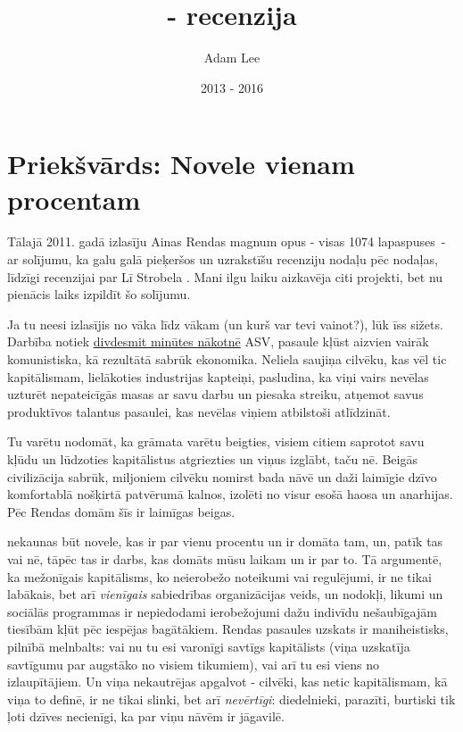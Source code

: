 \documentclass[12pt]{article}
\title{\say{Atlas Shrugged} - recenzija}
\author{Adam Lee}
\date{2013 - 2016}
\begin{document}
\maketitle

\tableofcontents

\section{Priekšvārds: Novele vienam procentam}
\label{sec:foreword}

Tālajā 2011. gadā izlasīju Ainas Rendas magnum opus  - visas 1074 lapaspuses~- ar solījumu, ka galu galā pieķeršos un uzrakstīšu recenziju nodaļu pēc nodaļas, līdzīgi recenzijai par Lī Strobela \href{https://web.archive.org/web/20160313005416/http://www.patheos.com/blogs/daylightatheism/series/the-case-for-a-creator}{}. Mani ilgu laiku aizkavēja citi projekti, bet nu pienācis laiks izpildīt šo solījumu.

Ja tu neesi izlasījis  no vāka līdz vākam (un kurš var tevi vainot?), lūk īss sižets. Darbība notiek \href{https://tvtropes.org/pmwiki/pmwiki.php/Main/TwentyMinutesIntoTheFuture}{divdesmit minūtes nākotnē} ASV, pasaule kļūst aizvien vairāk komunistiska, kā rezultātā sabrūk ekonomika. Neliela saujiņa cilvēku, kas vēl tic kapitālismam, lielākoties industrijas kapteiņi, pasludina, ka viņi vairs nevēlas uzturēt nepateicīgās masas ar savu darbu un piesaka streiku, atņemot savus produktīvos talantus pasaulei, kas nevēlas viņiem atbilstoši atlīdzināt.

Tu varētu nodomāt, ka grāmata varētu beigties, visiem citiem saprotot savu kļūdu un lūdzoties kapitālistus atgriezties un viņus izglābt, taču nē. Beigās civilizācija sabrūk, miljoniem cilvēku nomirst bada nāvē un daži laimīgie dzīvo komfortablā nošķirtā patvērumā kalnos, izolēti no visur esošā haosa un anarhijas. Pēc Rendas domām šīs ir laimīgas beigas.

 nekaunas būt novele, kas ir par vienu procentu un ir domāta tam, un, patīk tas vai nē, tāpēc tas ir darbs, kas domāts mūsu laikam un ir par to. Tā argumentē, ka mežonīgais kapitālisms, ko neierobežo noteikumi vai regulējumi, ir ne tikai labākais, bet arī \textit{vienīgais} sabiedrības organizācijas veids, un nodokļi, likumi un sociālās programmas ir nepiedodami ierobežojumi dažu indivīdu nešaubīgajām tiesībām kļūt pēc iespējas bagātākiem. Rendas pasaules uzskats ir maniheistisks, pilnībā melnbalts: vai nu tu esi varonīgi savtīgs kapitālists (viņa uzskatīja savtīgumu par augstāko no visiem tikumiem), vai arī tu esi viens no izlaupītājiem. Un viņa nekautrējas apgalvot - cilvēki, kas netic kapitālismam, kā viņa to definē, ir ne tikai slinki, bet arī \textit{nevērtīgi}: diedelnieki, parazīti, burtiski tik ļoti dzīves necienīgi, ka par viņu nāvēm ir jāgavilē.
\end{document}

